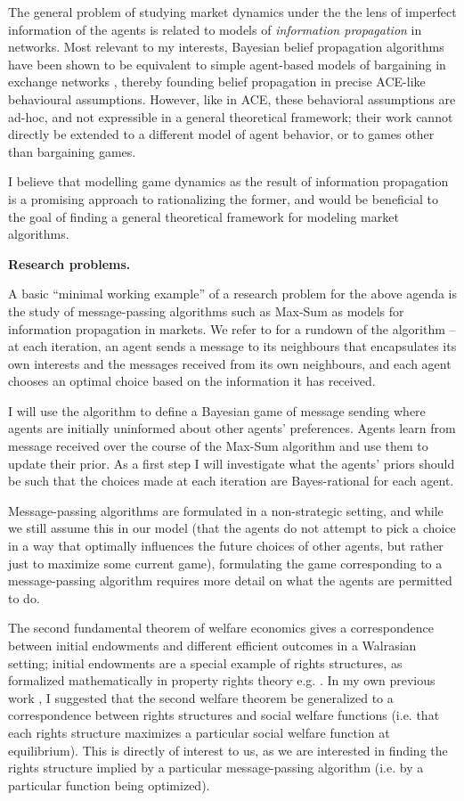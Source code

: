 \documentclass{article}
\newcommand{\statement}[1]{\par\medskip
  {\textbf{#1.}}\space
}
\begin{document}
The general problem of studying market dynamics under the the lens of imperfect information of the agents is related to models of \emph{information propagation} in networks. Most relevant to my interests, Bayesian belief propagation algorithms have been shown to be equivalent to simple agent-based models of bargaining in exchange networks \cite{bayati1, bayati2, bayati3}, thereby founding belief propagation in precise ACE-like behavioural assumptions. However, like in ACE, these behavioral assumptions are ad-hoc, and not expressible in a general theoretical framework; their work cannot directly be extended to a different model of agent behavior, or to games other than bargaining games.

I believe that modelling game dynamics as the result of information propagation is a promising approach to rationalizing the former, and would be beneficial to the goal of finding a general theoretical framework for modeling market algorithms. 

\statement{Research problems}

A basic ``minimal working example'' of a research problem for the above agenda is the study of message-passing algorithms such as Max-Sum as models for information propagation in markets. We refer to \cite{rogers} for a rundown of the algorithm -- at each iteration, an agent sends a message to its neighbours that encapsulates its own interests and the messages received from its own neighbours, and each agent chooses an optimal choice based on the information it has received.

I will use the algorithm to define a Bayesian game of message sending where agents are initially uninformed about other agents' preferences. Agents learn from message received over the course of the Max-Sum algorithm and use them to update their prior. As a first step I will investigate what the agents' priors should be such that the choices made at each iteration are Bayes-rational for each agent.


Message-passing algorithms are formulated in a non-strategic setting, and while we still assume this in our model (that the agents do not attempt to pick a choice in a way that optimally influences the future choices of other agents, but rather just to maximize some current game), formulating the game corresponding to a message-passing algorithm requires more detail on what the agents are permitted to do. 

The second fundamental theorem of welfare economics \cite{mas} gives a correspondence between initial endowments and different efficient outcomes in a Walrasian setting; initial endowments are a special example of rights structures, as formalized mathematically in property rights theory e.g. \cite{garden, pasu}. In my own previous work \cite{pasu}, I suggested that the second welfare theorem be generalized to a correspondence between rights structures and social welfare functions (i.e. that each rights structure maximizes a particular social welfare function at equilibrium). This is directly of interest to us, as we are interested in finding the rights structure implied by a particular message-passing algorithm (i.e. by a particular function being optimized).
\end{document}
